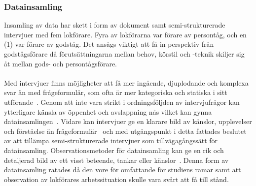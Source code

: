 \subsubsection{Datainsamling}\label{subsubsec:datainsamling}
Insamling av data har skett i form av dokument samt semi-strukturerade intervjuer med fem lokförare.
Fyra av lokförarna var förare av persontåg, och en (1) var förare av godståg.
Det ansågs viktigt att få in perspektiv från godstågsförare då förutsättningarna mellan behov, körstil och -teknik skiljer sig åt mellan gods- och persontågsförare.
\paragraph{}
\hspace{-11pt}Med intervjuer finns möjligheter att få mer ingående, djuplodande och komplexa svar än med frågeformulär, som ofta är mer kategoriska och statiska i sitt utförande~\cite{Oates2005}.
Genom att inte vara strikt i ordningsföljden av intervjufrågor kan ytterligare känsla av öppenhet och avslappning nås vilket kan gynna datainsamlingen~\cite{Oates2005}.
Vidare kan intervjuer ge en klarare bild av känslor, upplevelser och förståelse än frågeformulär~\cite{Oates2005} och med utgångspunkt i detta fattades beslutet av att tillämpa semi-strukturerade intervjuer som tillvägagångssätt för datainsamling.
Observationsmetoder för datainsamling kan ge en rik och detaljerad bild av ett visst beteende, tankar eller känslor~\cite{Oates2005}.
Denna form av datainsamling ratades då den vore för omfattande för studiens ramar samt att observation av lokförares arbetssituation skulle vara svårt att få till stånd.
